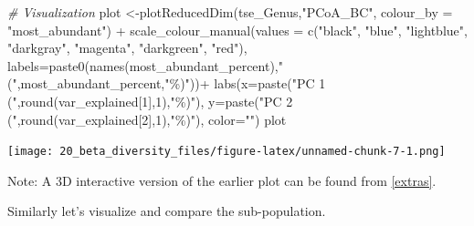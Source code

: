 \documentclass[
]{book}
\newenvironment{Shaded}{\begin{snugshade}}{\end{snugshade}}
\newcommand{\AttributeTok}[1]{\textcolor[rgb]{0.77,0.63,0.00}{#1}}
\newcommand{\CommentTok}[1]{\textcolor[rgb]{0.56,0.35,0.01}{\textit{#1}}}
\newcommand{\DecValTok}[1]{\textcolor[rgb]{0.00,0.00,0.81}{#1}}
\newcommand{\FunctionTok}[1]{\textcolor[rgb]{0.00,0.00,0.00}{#1}}
\newcommand{\NormalTok}[1]{#1}
\newcommand{\OtherTok}[1]{\textcolor[rgb]{0.56,0.35,0.01}{#1}}
\newcommand{\SpecialCharTok}[1]{\textcolor[rgb]{0.00,0.00,0.00}{#1}}
\newcommand{\StringTok}[1]{\textcolor[rgb]{0.31,0.60,0.02}{#1}}
\begin{document}
\begin{Shaded}
\begin{Highlighting}[]
\CommentTok{\# Visualization}
\NormalTok{plot }\OtherTok{\textless{}{-}}\FunctionTok{plotReducedDim}\NormalTok{(tse\_Genus,}\StringTok{"PCoA\_BC"}\NormalTok{, }\AttributeTok{colour\_by =} \StringTok{"most\_abundant"}\NormalTok{) }\SpecialCharTok{+}
  \FunctionTok{scale\_colour\_manual}\NormalTok{(}\AttributeTok{values =} \FunctionTok{c}\NormalTok{(}\StringTok{"black"}\NormalTok{, }\StringTok{"blue"}\NormalTok{, }\StringTok{"lightblue"}\NormalTok{, }\StringTok{"darkgray"}\NormalTok{, }\StringTok{"magenta"}\NormalTok{, }\StringTok{"darkgreen"}\NormalTok{, }\StringTok{"red"}\NormalTok{),}
                      \AttributeTok{labels=}\FunctionTok{paste0}\NormalTok{(}\FunctionTok{names}\NormalTok{(most\_abundant\_percent),}\StringTok{"("}\NormalTok{,most\_abundant\_percent,}\StringTok{"\%)"}\NormalTok{))}\SpecialCharTok{+}
  \FunctionTok{labs}\NormalTok{(}\AttributeTok{x=}\FunctionTok{paste}\NormalTok{(}\StringTok{"PC 1 ("}\NormalTok{,}\FunctionTok{round}\NormalTok{(var\_explained[}\DecValTok{1}\NormalTok{],}\DecValTok{1}\NormalTok{),}\StringTok{"\%)"}\NormalTok{),}
       \AttributeTok{y=}\FunctionTok{paste}\NormalTok{(}\StringTok{"PC 2 ("}\NormalTok{,}\FunctionTok{round}\NormalTok{(var\_explained[}\DecValTok{2}\NormalTok{],}\DecValTok{1}\NormalTok{),}\StringTok{"\%)"}\NormalTok{),}
       \AttributeTok{color=}\StringTok{""}\NormalTok{)}
\NormalTok{plot}
\end{Highlighting}
\end{Shaded}

\texttt{[image: 20\_beta\_diversity\_files/figure-latex/unnamed-chunk-7-1.png]}

Note: A 3D interactive version of the earlier plot can be found from \ref{extras}.

Similarly let's visualize and compare the sub-population.
\end{document}
